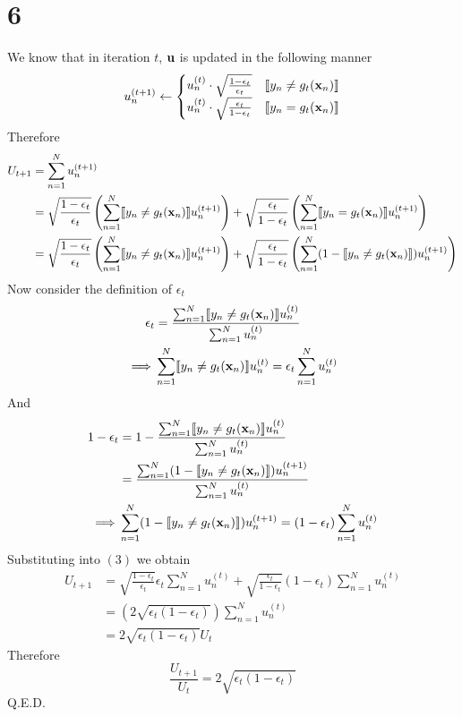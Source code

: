 \documentclass[11pt]{article}
\theoremstyle{definition}
\begin{document}
\section*{6}
We know that in iteration $t$, $\vb{u}$ is updated in the following manner 
\[
  u_n^{(t + 1)} \leftarrow
  \begin{cases}
    u_n^{(t)}\cdot\sqrt{\frac{1 - \epsilon_t}{\epsilon_t}} & \llbracket y_n\neq g_t(\vb{x}_n)\rrbracket \\
    u_n^{(t)}\cdot\sqrt{\frac{\epsilon_t}{1 - \epsilon_t}} & \llbracket y_n = g_t(\vb{x}_n)\rrbracket \\
  \end{cases}
\]
Therefore
\begin{align}
  U_{t + 1} &= \sum^N_{n = 1}u_n^{(t + 1)} \\ 
  &= \sqrt{\frac{1 - \epsilon_t}{\epsilon_t}}\left(\sum^N_{n = 1}\llbracket y_n\neq g_t(\vb{x}_n)\rrbracket u_n^{(t + 1)}\right) + \sqrt{\frac{\epsilon_t}{1 - \epsilon_t}}\left(\sum^N_{n = 1}\llbracket y_n = g_t(\vb{x}_n)\rrbracket u_n^{(t + 1)}\right) \\ 
  &= \sqrt{\frac{1 - \epsilon_t}{\epsilon_t}}\left(\sum^N_{n = 1}\llbracket y_n\neq g_t(\vb{x}_n)\rrbracket u_n^{(t + 1)}\right) + \sqrt{\frac{\epsilon_t}{1 - \epsilon_t}}\left(\sum^N_{n = 1}(1 - \llbracket y_n \neq g_t(\vb{x}_n)\rrbracket) u_n^{(t + 1)}\right) 
\end{align}
Now consider the definition of $\epsilon_t$ 
\begin{align*}
  \epsilon_t &= \frac{\sum^N_{n = 1}\llbracket y_n\neq g_t(\vb{x}_n)\rrbracket u_n^{(t)}}{\sum^N_{n = 1}u_n^{(t)}} \\ 
  \implies & \sum^N_{n = 1}\llbracket y_n\neq g_t(\vb{x}_n)\rrbracket u_n^{(t)} = \epsilon_t\sum^N_{n = 1}u_n^{(t)}
\end{align*}
And 
\begin{align*}
  1 - \epsilon_t &= 1 - \frac{\sum^N_{n = 1}\llbracket y_n\neq g_t(\vb{x}_n)\rrbracket u_n^{(t)}}{\sum^N_{n = 1}u_n^{(t)}} \\ 
  &= \frac{\sum^N_{n = 1}(1 - \llbracket y_n \neq g_t(\vb{x}_n)\rrbracket) u_n^{(t + 1)}}{\sum^N_{n = 1}u_n^{(t)}} \\
  \implies & \sum^N_{n = 1}(1 - \llbracket y_n \neq g_t(\vb{x}_n)\rrbracket) u_n^{(t + 1)} = (1 - \epsilon_t)\sum^N_{n = 1}u_n^{(t)}
\end{align*}
Substituting into $(3)$ we obtain
\begin{align*}
  U_{t + 1} &= \sqrt{\frac{1 - \epsilon_t}{\epsilon_t}}\epsilon_t\sum^N_{n = 1}u_n^{(t)} + \sqrt{\frac{\epsilon_t}{1 - \epsilon_t}}(1 - \epsilon_t)\sum^N_{n = 1}u_n^{(t)} \\ 
  &= \left(2\sqrt{\epsilon_t(1 - \epsilon_t)}\right)\sum^N_{n = 1}u_n^{(t)} \\ 
  &= 2\sqrt{\epsilon_t(1 - \epsilon_t)}U_t
\end{align*}
Therefore 
\[
  \frac{U_{t + 1}}{U_t} = 2\sqrt{\epsilon_t(1 - \epsilon_t)}
\]
Q.E.D.
\newpage
\end{document}
